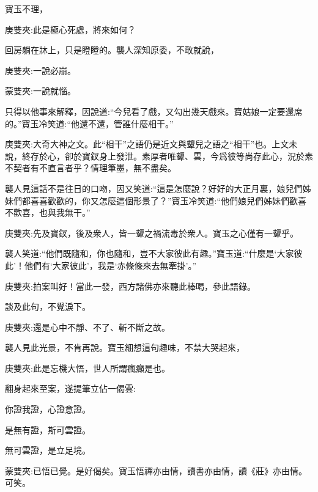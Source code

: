 \begin{parag}
    寶玉不理，\begin{note}庚雙夾:此是極心死處，將來如何？\end{note}回房躺在牀上，只是瞪瞪的。襲人深知原委，不敢就說，\begin{note}庚雙夾:一說必崩。\end{note}\begin{note}蒙雙夾:一說就惱。\end{note}只得以他事來解釋，因說道:“今兒看了戲，又勾出幾天戲來。寶姑娘一定要還席的。”寶玉冷笑道:“他還不還，管誰什麼相干。”\begin{note}庚雙夾:大奇大神之文。此“相干”之語仍是近文與顰兒之語之“相干”也。上文未說，終存於心，卻於寶釵身上發泄。素厚者唯顰、雲，今爲彼等尚存此心，況於素不契者有不直言者乎？情理筆墨，無不盡矣。\end{note}襲人見這話不是往日的口吻，因又笑道:“這是怎麼說？好好的大正月裏，娘兒們姊妹們都喜喜歡歡的，你又怎麼這個形景了？”寶玉冷笑道:“他們娘兒們姊妹們歡喜不歡喜，也與我無干。”\begin{note}庚雙夾:先及寶釵，後及衆人，皆一顰之禍流毒於衆人。寶玉之心僅有一顰乎。\end{note}襲人笑道:“他們既隨和，你也隨和，豈不大家彼此有趣。”寶玉道:“什麼是‘大家彼此’！他們有‘大家彼此’，我是‘赤條條來去無牽掛’。”\begin{note}庚雙夾:拍案叫好！當此一發，西方諸佛亦來聽此棒喝，參此語錄。\end{note}談及此句，不覺淚下。\begin{note}庚雙夾:還是心中不靜、不了、斬不斷之故。\end{note}襲人見此光景，不肯再說。寶玉細想這句趣味，不禁大哭起來，\begin{note}庚雙夾:此是忘機大悟，世人所謂瘋癲是也。\end{note}翻身起來至案，遂提筆立佔一偈雲:
\end{parag}


\begin{poem}
    \begin{pl}你證我證，心證意證。\end{pl}

    \begin{pl}是無有證，斯可雲證。\end{pl}

    \begin{pl}無可雲證，是立足境。\end{pl}
    \begin{note}蒙雙夾:已悟已覺。是好偈矣。寶玉悟禪亦由情，讀書亦由情，讀《莊》亦由情。可笑。\end{note}
\end{poem}


